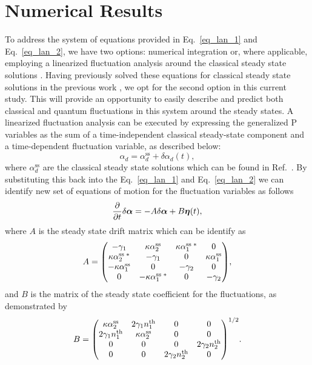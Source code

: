 \documentclass[fleqn,11pt]{wlscirep}
\begin{document}
\section*{Numerical Results}

To address the system of equations provided in Eq.~\eqref{eq_lan_1} and Eq.~\eqref{eq_lan_2}, we have two options: numerical integration or, where applicable, employing a linearized fluctuation analysis around the classical steady state solutions \cite{olsen2013}. Having previously solved these equations for classical steady state solutions in the previous work \cite{drummond1980n}, we opt for the second option in this current study. This will provide an opportunity to easily describe and predict both classical and quantum fluctuations in this system around the steady states.
A linearized fluctuation analysis can be executed by expressing the generalized P variables as the sum of a time-independent classical steady-state component and a time-dependent fluctuation variable, as described below:
\begin{equation}
	\alpha_d = \alpha_d^{\text{ss}} + \delta\alpha_d(t),
\end{equation}
where $\alpha_d^{\text{ss}}$ are the classical steady state solutions which can be found in Ref.~\cite{drummond1980n}. By substituting this back into the Eq.~\eqref{eq_lan_1} and Eq.~\eqref{eq_lan_2} we can identify new set of equations of motion for the fluctuation variables as follows
\begin{equation}
	\pdv{t}\delta\boldsymbol{\alpha} =
	-A \delta\boldsymbol{\alpha} + B \boldsymbol{\eta}(t),
\end{equation}
where $A$ is the steady state drift matrix which can be identify as
\begin{equation}
	A = \mqty(
		-\gamma_1 & \kappa\alpha_2^{\text{ss}} & \kappa \alpha_1^{\text{ss}\;*} & 0 \\
		\kappa \alpha_2^{\text{ss}\;*} & -\gamma_1 & 0 & \kappa\alpha_1^{\text{ss}} \\
		-\kappa\alpha_1^{\text{ss}} & 0 & -\gamma_2 & 0 \\
		0 & -\kappa\alpha_1^{\text{ss}\;*} & 0 & -\gamma_2
	),
\end{equation}
and $B$ is the matrix of the steady state coefficient for the fluctuations, as demonstrated by
\begin{equation}
	B = \mqty(
		\kappa\alpha_2^{\text{ss}} & 2\gamma_1n^{\text{th}}_1 & 0 & 0 \\
		2\gamma_1n^{\text{th}}_1 & \kappa\alpha_2^{\text{ss}} & 0 & 0 \\
		0 & 0 & 0 & 2\gamma_2n^{\text{th}}_2 \\
		0 & 0 & 2\gamma_2n^{\text{th}}_2 & 0
	)^{1/2}.
\end{equation}
\end{document}
